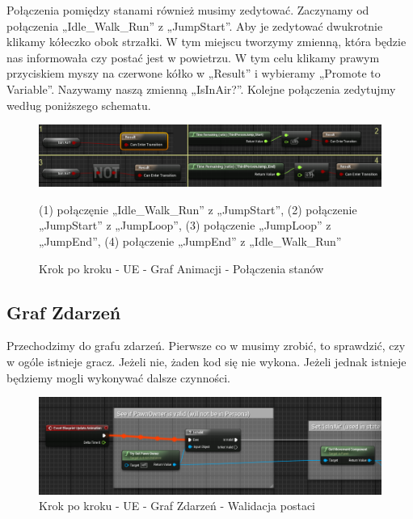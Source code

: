 \documentclass[12pt]{xmgr}
\begin{document}
Połączenia pomiędzy stanami również musimy zedytować. Zaczynamy od połączenia „Idle\_Walk\_Run” z „JumpStart”. Aby je zedytować dwukrotnie klikamy kółeczko obok strzałki. W tym miejscu tworzymy zmienną, która będzie nas informowała czy postać jest w powietrzu. W tym celu klikamy prawym przyciskiem myszy na czerwone kółko w „Result” i wybieramy „Promote to Variable”. Nazywamy naszą zmienną „IsInAir?”. Kolejne połączenia zedytujmy według poniższego schematu.
\newpage
\begin{figure}[!htb]
    \begin{center}
    \includegraphics[scale=0.5]{Screeny/UeKrokPoKroku/UE-AnimGraph-Connect.png}
    \end{center}
    \caption{Krok po kroku - UE -  Graf Animacji - Połączenia stanów}
 (1) połączęnie „Idle\_Walk\_Run” z „JumpStart”, (2) połączenie „JumpStart” z „JumpLoop”, (3) połączenie „JumpLoop” z „JumpEnd”, (4) połączenie „JumpEnd” z „Idle\_Walk\_Run”
\end{figure}

\subsection{Graf Zdarzeń}
Przechodzimy do grafu zdarzeń. Pierwsze co w musimy zrobić, to sprawdzić, czy w ogóle istnieje gracz. Jeżeli nie, żaden kod się nie wykona. Jeżeli jednak istnieje będziemy mogli wykonywać dalsze czynności.

\begin{figure}[!htb]
    \begin{center}
    \includegraphics[scale=0.6]{Screeny/UeKrokPoKroku/UE-EventGraph-IsValid.png}
    \end{center}
    \caption{Krok po kroku - UE -  Graf Zdarzeń - Walidacja postaci}
\end{figure}
\end{document}
